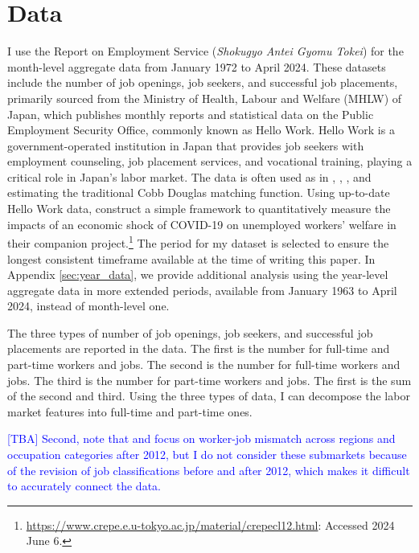 \documentclass[12pt]{article}
\begin{document}
\section{Data}

I use the Report on Employment Service (\textit{Shokugyo Antei Gyomu Tokei}) for the month-level aggregate data from January 1972 to April 2024. 
These datasets include the number of job openings, job seekers, and successful job placements, primarily sourced from the Ministry of Health, Labour and Welfare (MHLW) of Japan, which publishes monthly reports and statistical data on the Public Employment Security Office, commonly known as Hello Work. 
Hello Work is a government-operated institution in Japan that provides job seekers with employment counseling, job placement services, and vocational training, playing a critical role in Japan's labor market. 
The data is often used as in \cite{kano2005estimating}, \cite{kambayashi2006vacancy}, \cite{sasaki2008matching}, and \cite{higashi2018spatial} estimating the traditional Cobb Douglas matching function.
Using up-to-date Hello Work data, \cite{kawata2021first} construct a simple framework to quantitatively measure the impacts of an economic shock of COVID-19 on unemployed workers’ welfare in their companion project.\footnote{\url{https://www.crepe.e.u-tokyo.ac.jp/material/crepecl12.html}: Accessed 2024 June 6.} 
The period for my dataset is selected to ensure the longest consistent timeframe available at the time of writing this paper.
In Appendix \ref{sec:year_data}, we provide additional analysis using the year-level aggregate data in more extended periods, available from January 1963 to April 2024, instead of month-level one.

The three types of number of job openings, job seekers, and successful job placements are reported in the data. 
The first is the number for full-time and part-time workers and jobs.
The second is the number for full-time workers and jobs.
The third is the number for part-time workers and jobs.
The first is the sum of the second and third.
Using the three types of data, I can decompose the labor market features into full-time and part-time ones.

\textcolor{blue}{[TBA] Second, note that \cite{kawata2019} and \cite{higashi2018spatial} focus on worker-job mismatch across regions and occupation categories after 2012, but I do not consider these submarkets because of the revision of job classifications before and after 2012, which makes it difficult to accurately connect the data.}
\end{document}
